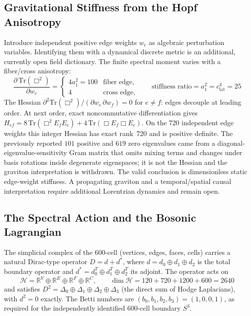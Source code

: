 \documentclass[12pt,a4paper]{article}
\theoremstyle{definition}
\begin{document}
\subsection{Gravitational Stiffness from the Hopf Anisotropy}

Introduce independent positive edge weights $w_e$ as algebraic perturbation variables.  Identifying them with a dynamical discrete metric is an additional, currently open field dictionary.  The finite spectral moment varies with a fiber/cross anisotropy:
\begin{equation}
\frac{\partial\,\mathrm{Tr}(\Box^2)}{\partial w_e} =
\begin{cases}
4a_1^2 = 100 & \text{fiber edge},\\[2pt]
4 & \text{cross edge},
\end{cases}
\qquad
\boxed{\text{stiffness ratio} = a_1^2 = c_{\mathrm{lat}}^4 = 25}
\label{eq:gravitational_stiffness}
\end{equation}
The Hessian $\partial^2\mathrm{Tr}(\Box^2)/(\partial w_e\,\partial w_f) = 0$ for $e \ne f$: edges decouple at leading order.  At next order, exact noncommutative differentiation gives $H_{ef}=8\,\mathrm{Tr}(\Box^2E_fE_e)+4\,\mathrm{Tr}(\Box E_f\Box E_e)$.  On the 720 independent edge weights this integer Hessian has exact rank~720 and is positive definite.  The previously reported $101$ positive and $619$ zero eigenvalues came from a diagonal-eigenvalue-sensitivity Gram matrix that omits mixing terms and changes under basis rotations inside degenerate eigenspaces; it is not the Hessian and the graviton interpretation is withdrawn.  The valid conclusion is dimensionless static edge-weight stiffness.  A propagating graviton and a temporal/spatial causal interpretation require additional Lorentzian dynamics and remain open.


\subsection{The Spectral Action and the Bosonic Lagrangian}
\label{sec:spectral_action}

The simplicial complex of the 600-cell (vertices, edges, faces, cells) carries a natural Dirac-type operator $D = d + d^*$, where $d = d_0 \oplus d_1 \oplus d_2$ is the total boundary operator and $d^* = d_0^T \oplus d_1^T \oplus d_2^T$ its adjoint. The operator acts on
\begin{equation}
\mathcal{H} = \mathbb{R}^V \oplus \mathbb{R}^E \oplus \mathbb{R}^F \oplus \mathbb{R}^C, \qquad \dim \mathcal{H} = 120 + 720 + 1200 + 600 = 2640
\end{equation}
and satisfies $D^2 = \Delta_0 \oplus \Delta_1 \oplus \Delta_2 \oplus \Delta_3$ (the direct sum of Hodge Laplacians), with $d^2 = 0$ exactly. The Betti numbers are $(b_0, b_1, b_2, b_3) = (1, 0, 0, 1)$, as required for the independently identified 600-cell boundary $S^3$.
\end{document}
